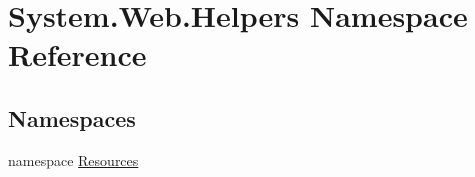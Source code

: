 \hypertarget{namespaceSystem_1_1Web_1_1Helpers}{}\section{System.\+Web.\+Helpers Namespace Reference}
\label{namespaceSystem_1_1Web_1_1Helpers}
\subsection*{Namespaces}
\begin{DoxyCompactItemize}
\item 
namespace \hyperlink{namespaceSystem_1_1Web_1_1Helpers_1_1Resources}{Resources}
\end{DoxyCompactItemize}
